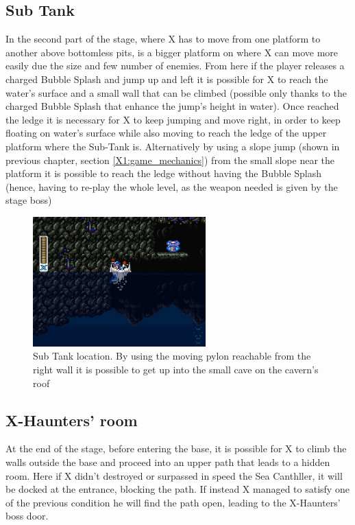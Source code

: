 \subsection{Sub Tank}
In the second part of the stage, where X has to move from one platform to another above bottomless pits, is a bigger platform on where X can move more easily due the size and few number of enemies. From here if the player releases a charged Bubble Splash and jump up and left it is possible for X to reach the water's surface and a small wall that can be climbed (possible only thanks to the charged Bubble Splash that enhance the jump's height in water). Once reached the ledge it is necessary for X to keep jumping and move right, in order to keep floating on water's surface while also moving to reach the ledge of the upper platform where the Sub-Tank is. Alternatively by using a slope jump (shown in previous chapter, section \ref{X1:game_mechanics}) from the small slope near the platform it is possible to reach the ledge without having the Bubble Splash (hence, having to re-play the whole level, as the weapon needed is given by the stage boss)
\begin{figure}[htp]
	\centering
	\includegraphics[height=5cm]{figures/X2/Bubble_crab/Crab_tank.png}
	\caption{Sub Tank location. By using the moving pylon reachable from the right wall it is possible to get up into the small cave on the cavern's roof}
\end{figure}


\subsection{X-Haunters' room}
At the end of the stage, before entering the base, it is possible for X to climb the walls outside the base and proceed into an upper path that leads to a hidden room. Here if X didn't destroyed or surpassed in speed the Sea Canthller, it will be docked at the entrance, blocking the path. If instead X managed to satisfy one of the previous condition he will find the path open, leading to the X-Haunters' boss door.

